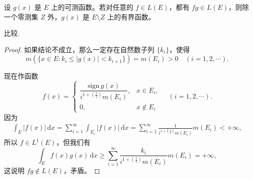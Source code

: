 \documentclass[../../main.tex]{subfiles}%
\begin{document}
\begin{proposition}
设 $g(x)$ 是 $E$ 上的可测函数。若对任意的 $f \in L(E)$，都有 $fg \in L(E)$，则除一个零测集 $Z$ 外，$g(x)$ 是 $E \setminus Z$ 上的有界函数。
\end{proposition}
\begin{remark}
比较.
\end{remark}
\begin{proof}
如果结论不成立，那么一定存在自然数子列 $\{ k_i \}$，使得
\[
m(\{ x \in E : k_i \leqslant |g(x)| < k_{i+1} \}) = m(E_i) > 0 \quad (i = 1, 2, \cdots).
\]

现在作函数
\[
f(x) = 
\begin{cases} 
\dfrac{\text{sign}\,g(x)}{i^{1 + (\frac{1}{2})} m(E_i)}, & x \in E_i, \\
0, & x \notin E_i 
\end{cases} \quad (i = 1, 2, \cdots).
\]
因为
\begin{align*}
\int_E |f(x)| \, \mathrm{d}x = \sum_{i=1}^{\infty} \int_{E_i} |f(x)| \, \mathrm{d}x = \sum_{i=1}^{\infty} \frac{1}{i^{1 + (\frac{1}{2})} m(E_i)} m(E_i) < +\infty,
\end{align*}
所以 $f \in L^1(E)$，但我们有
\[
\int_E f(x)g(x) \, \mathrm{d}x \geqslant \sum_{i=1}^{\infty} \frac{k_i}{i^{1 + (\frac{1}{2})} m(E_i)} m(E_i) = +\infty,
\]
这说明 $fg \notin L(E)$，矛盾。
\end{proof}
\end{document}
